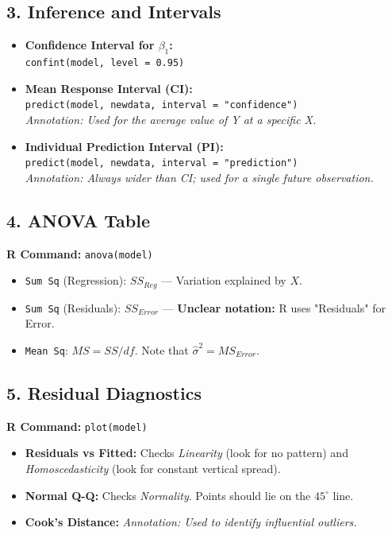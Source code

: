 \documentclass{article}
\begin{document}
\subsection*{3. Inference and Intervals}
\begin{itemize}
    \item \textbf{Confidence Interval for $\beta_1$:} \\
    \texttt{confint(model, level = 0.95)} 
    
    \item \textbf{Mean Response Interval (CI):} \\
    \texttt{predict(model, newdata, interval = "confidence")} \\
    \textit{Annotation: Used for the average value of Y at a specific X.}
    
    \item \textbf{Individual Prediction Interval (PI):} \\
    \texttt{predict(model, newdata, interval = "prediction")} \\
    \textit{Annotation: Always wider than CI; used for a single future observation.}
\end{itemize}

\subsection*{4. ANOVA Table}
\textbf{R Command:} \texttt{anova(model)}

\begin{itemize}
    \item \texttt{Sum Sq} (Regression): $SS_{Reg}$ --- Variation explained by $X$.
    \item \texttt{Sum Sq} (Residuals): $SS_{Error}$ --- \textbf{Unclear notation:} R uses "Residuals" for Error.
    \item \texttt{Mean Sq}: $MS = SS/df$. Note that $\hat{\sigma}^2 = MS_{Error}$.
\end{itemize}

\subsection*{5. Residual Diagnostics}
\textbf{R Command:} \texttt{plot(model)}

\begin{itemize}
    \item \textbf{Residuals vs Fitted:} Checks \textit{Linearity} (look for no pattern) and \textit{Homoscedasticity} (look for constant vertical spread).
    \item \textbf{Normal Q-Q:} Checks \textit{Normality}. Points should lie on the $45^\circ$ line. 
    \item \textbf{Cook's Distance:} \textit{Annotation: Used to identify influential outliers.}
\end{itemize}
\end{document}
